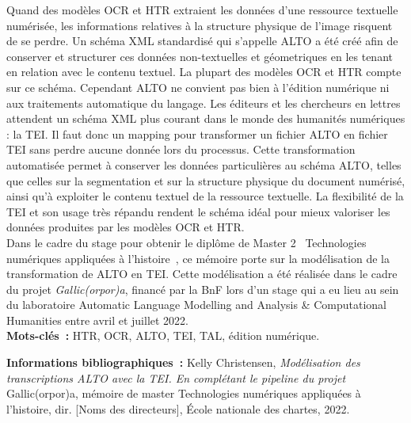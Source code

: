 \documentclass[class=article, crop=false]{standalone}
\begin{document}
\medskip

Quand des modèles OCR et HTR extraient les données d'une ressource textuelle numérisée, les informations relatives à la structure physique de l'image risquent de se perdre. Un schéma XML standardisé qui s'appelle ALTO a été créé afin de conserver et structurer ces données non-textuelles et géometriques en les tenant en relation avec le contenu textuel. La plupart des modèles OCR et HTR compte sur ce schéma. Cependant ALTO ne convient pas bien à l'édition numérique ni aux traitements automatique du langage. Les éditeurs et les chercheurs en lettres attendent un schéma XML plus courant dans le monde des humanités numériques : la TEI. Il faut donc un mapping pour transformer un fichier ALTO en fichier TEI sans perdre aucune donnée lors du processus. Cette transformation automatisée permet à conserver les données particulières au schéma ALTO, telles que celles sur la segmentation et sur la structure physique du document numérisé, ainsi qu'à exploiter le contenu textuel de la ressource textuelle. La flexibilité de la TEI et son usage très répandu rendent le schéma idéal pour mieux valoriser les données produites par les modèles OCR et HTR.\\

Dans le cadre du stage pour obtenir le diplôme de Master 2 \og~Technologies numériques appliquées à l'histoire~\fg{}, ce mémoire porte sur la modélisation de la transformation de ALTO en TEI. Cette modélisation a été réalisée dans le cadre du projet \textit{Gallic(orpor)a}, financé par la BnF lors d'un stage qui a eu lieu au sein du laboratoire Automatic Language Modelling and Analysis \& Computational Humanities entre avril et juillet 2022.\\
	
	\textbf{Mots-clés~:} HTR, OCR, ALTO, TEI, TAL, édition numérique.
	
	\textbf{Informations bibliographiques~:} Kelly Christensen, \textit{Modélisation des transcriptions ALTO avec la TEI. En complétant le pipeline du projet} Gallic(orpor)a, mémoire de master \og{}Technologies numériques appliquées à l'histoire\fg{}, dir. [Noms des directeurs], École nationale des chartes, 2022.
	
\end{document}
